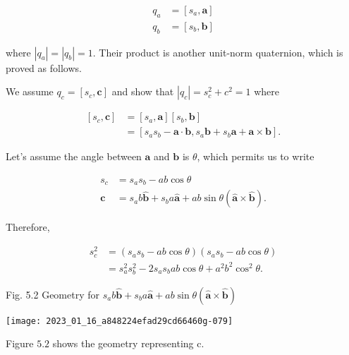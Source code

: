 $$
\begin{aligned}
q_{a} & =\left[s_{a}, \mathbf{a}\right] \\
q_{b} & =\left[s_{b}, \mathbf{b}\right]
\end{aligned}
$$

where $\left|q_{a}\right|=\left|q_{b}\right|=1$. Their product is another unit-norm quaternion, which is proved as follows.

We assume $q_{c}=\left[s_{c}, \mathbf{c}\right]$ and show that $\left|q_{c}\right|=s_{c}^{2}+c^{2}=1$ where

$$
\begin{aligned}
{\left[s_{c}, \mathbf{c}\right] } & =\left[s_{a}, \mathbf{a}\right]\left[s_{b}, \mathbf{b}\right] \\
& =\left[s_{a} s_{b}-\mathbf{a} \cdot \mathbf{b}, s_{a} \mathbf{b}+s_{b} \mathbf{a}+\mathbf{a} \times \mathbf{b}\right] .
\end{aligned}
$$

Let's assume the angle between $\mathbf{a}$ and $\mathbf{b}$ is $\theta$, which permits us to write

$$
\begin{aligned}
s_{c} & =s_{a} s_{b}-a b \cos \theta \\
\mathbf{c} & =s_{a} b \hat{\mathbf{b}}+s_{b} a \hat{\mathbf{a}}+a b \sin \theta(\hat{\mathbf{a}} \times \hat{\mathbf{b}}) .
\end{aligned}
$$

Therefore,

$$
\begin{aligned}
s_{c}^{2} & =\left(s_{a} s_{b}-a b \cos \theta\right)\left(s_{a} s_{b}-a b \cos \theta\right) \\
& =s_{a}^{2} s_{b}^{2}-2 s_{a} s_{b} a b \cos \theta+a^{2} b^{2} \cos ^{2} \theta .
\end{aligned}
$$

Fig. 5.2 Geometry for $s_{a} b \hat{\mathbf{b}}+s_{b} a \hat{\mathbf{a}}+a b \sin \theta(\hat{\mathbf{a}} \times \hat{\mathbf{b}})$

\begin{center}
\texttt{[image: 2023\_01\_16\_a848224efad29cd66460g-079]}
\end{center}

Figure $5.2$ shows the geometry representing c.

